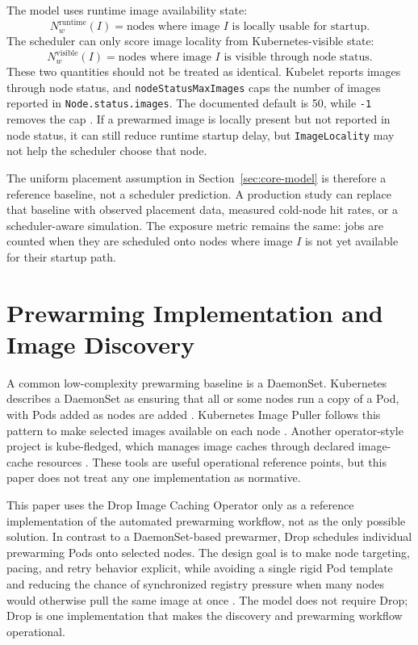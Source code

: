 \documentclass[11pt,a4paper]{article}
\begin{document}
The model uses runtime image availability state:
\[
N_w^{\mathrm{runtime}}(I)=\text{nodes where image \(I\) is locally usable for startup}.
\]
The scheduler can only score image locality from Kubernetes-visible state:
\[
N_w^{\mathrm{visible}}(I)=\text{nodes where image \(I\) is visible through node status}.
\]
These two quantities should not be treated as identical. Kubelet reports images through node status, and \texttt{nodeStatusMaxImages} caps the number of images reported in \texttt{Node.status.images}. The documented default is 50, while \texttt{-1} removes the cap \cite{kubeletconfig}. If a prewarmed image is locally present but not reported in node status, it can still reduce runtime startup delay, but \texttt{ImageLocality} may not help the scheduler choose that node.

The uniform placement assumption in Section~\ref{sec:core-model} is therefore a reference baseline, not a scheduler prediction. A production study can replace that baseline with observed placement data, measured cold-node hit rates, or a scheduler-aware simulation. The exposure metric remains the same: jobs are counted when they are scheduled onto nodes where image \(I\) is not yet available for their startup path.

\section{Prewarming Implementation and Image Discovery}

A common low-complexity prewarming baseline is a DaemonSet. Kubernetes describes a DaemonSet as ensuring that all or some nodes run a copy of a Pod, with Pods added as nodes are added \cite{kubernetesdaemonset}. Kubernetes Image Puller follows this pattern to make selected images available on each node \cite{kubernetesimagepuller}. Another operator-style project is kube-fledged, which manages image caches through declared image-cache resources \cite{kubefledged}. These tools are useful operational reference points, but this paper does not treat any one implementation as normative.

This paper uses the Drop Image Caching Operator only as a reference implementation of the automated prewarming workflow, not as the only possible solution. In contrast to a DaemonSet-based prewarmer, Drop schedules individual prewarming Pods onto selected nodes. The design goal is to make node targeting, pacing, and retry behavior explicit, while avoiding a single rigid Pod template and reducing the chance of synchronized registry pressure when many nodes would otherwise pull the same image at once \cite{drop,dropdiscovery}. The model does not require Drop; Drop is one implementation that makes the discovery and prewarming workflow operational.
\end{document}

